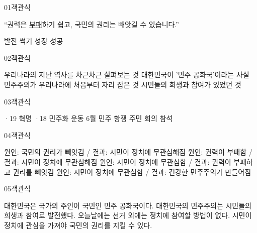 \documentclass[fs95,seriesFre]{korfarm-base}
\begin{document}
\begin{kfQBlock}{01}{객관식}
\begin{kfEvidence}“권력은 \uline{부패}하기 쉽고, 국민의 권리는 빼앗길 수 있습니다.”\end{kfEvidence}
\begin{kfChoices}
\kfChoice 발전
\kfChoice 썩기
\kfChoice 성장
\kfChoice 성공
\end{kfChoices}
\end{kfQBlock}
\begin{kfQBlock}{02}{객관식}
\begin{kfChoices}
\kfChoice 우리나라의 지난 역사를 차근차근 살펴보는 것
\kfChoice 대한민국이 '민주 공화국'이라는 사실
\kfChoice 민주주의가 우리나라에 처음부터 자리 잡은 것
\kfChoice 시민들의 희생과 참여가 있었던 것
\end{kfChoices}
\end{kfQBlock}
\begin{kfQBlock}{03}{객관식}
\begin{kfChoices}
·19 혁명
·18 민주화 운동
\kfChoice 6월 민주 항쟁
\kfChoice 주민 회의 참석
\end{kfChoices}
\end{kfQBlock}
\begin{kfQBlock}{04}{객관식}
\begin{kfChoices}
\kfChoice 원인: 국민의 권리가 빼앗김 / 결과: 시민이 정치에 무관심해짐
\kfChoice 원인: 권력이 부패함 / 결과: 시민이 정치에 무관심해짐
\kfChoice 원인: 시민이 정치에 무관심함 / 결과: 권력이 부패하고 권리를 빼앗김
\kfChoice 원인: 시민이 정치에 무관심함 / 결과: 건강한 민주주의가 만들어짐
\end{kfChoices}
\end{kfQBlock}
\begin{kfQBlock}{05}{객관식}
\begin{kfChoices}
\kfChoice 대한민국은 국가의 주인이 국민인 민주 공화국이다.
\kfChoice 대한민국의 민주주의는 시민들의 희생과 참여로 발전했다.
\kfChoice 오늘날에는 선거 외에는 정치에 참여할 방법이 없다.
\kfChoice 시민이 정치에 관심을 가져야 국민의 권리를 지킬 수 있다.
\end{kfChoices}
\end{kfQBlock}
\end{document}
